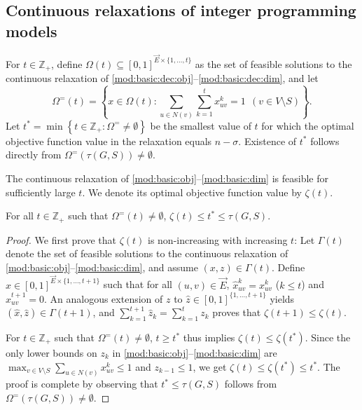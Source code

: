 \subsection{Continuous relaxations of integer programming models} \label{sec:lblprel}

For $t\in\mathbb{Z}_+$, define $\Omega(t)\subseteq[0,1]^{\overrightarrow{E}\times\{1,\ldots,t\}}$ as the set of feasible solutions to the continuous relaxation of
\eqref{mod:basic:dec:obj}--\eqref{mod:basic:dec:dim},
and let
\[
 \Omega^=(t) = \left\{x\in\Omega(t): \sum\limits_{u \in N(v)} \sum\limits_{k=1}^tx_{uv}^k = 1 ~~(v\in V\setminus S)\right\}.
\]
Let $t^{\ast}=\min\left\{t\in\mathbb{Z}_+: \Omega^=\neq\emptyset\right\}$ be the smallest value of $t$ for which the optimal objective function value in
the relaxation equals $n-\sigma$.
Existence of $t^{\ast}$ follows directly from $\Omega^=\left(\tau(G,S)\right)\neq\emptyset$.

The continuous relaxation of \eqref{mod:basic:obj}--\eqref{mod:basic:dim} is feasible for sufficiently large $t$.
We denote its optimal objective function value by $\zeta(t)$.

\begin{proposition} \label{prop:lpweak}
For all $t\in\mathbb{Z}_+$ such that $\Omega^=(t)\neq\emptyset$, $\zeta(t)\leq t^{\ast}\leq\tau(G,S)$.
\end{proposition}
\begin{proof}
We first prove that $\zeta(t)$ is non-increasing with increasing $t$:
Let $\Gamma(t)$ denote the set of feasible solutions to the continuous relaxation of \eqref{mod:basic:obj}--\eqref{mod:basic:dim}, and assume $(x,z)\in\Gamma(t)$.
Define $\hat{x}\in[0,1]^{\overrightarrow{E}\times\{1,\ldots,t+1\}}$ such that
for all $(u,v)\in \overrightarrow{E}$, $\hat{x}_{uv}^k=x_{uv}^k$ ($k\leq t$) and $\hat{x}_{uv}^{t+1}=0$.
An analogous extension of $z$ to $\hat{z}\in[0,1]^{\{1,\ldots,t+1\}}$ yields $(\hat{x},\hat{z})\in\Gamma(t+1)$,
and $\sum_{k=1}^{t+1}\hat{z}_k=\sum_{k=1}^tz_k$ proves that $\zeta(t+1)\leq\zeta(t)$.

For $t\in\mathbb{Z}_+$ such that $\Omega^=(t)\neq\emptyset$, $t\geq t^{\ast}$ thus implies $\zeta(t)\leq\zeta(t^{\ast})$.
Since the only lower bounds on $z_k$ in \eqref{mod:basic:obj}--\eqref{mod:basic:dim} are $\max_{v\in V\setminus S}\sum\limits_{u \in N(v)}x_{uv}^k\leq 1$ and $z_{k-1}\leq 1$,
we get $\zeta(t)\leq\zeta(t^{\ast})\leq t^{\ast}$.
The proof is complete by observing that $t^{\ast}\leq\tau(G,S)$ follows from $\Omega^=\left(\tau(G,S)\right)\neq\emptyset$.
\end{proof}

